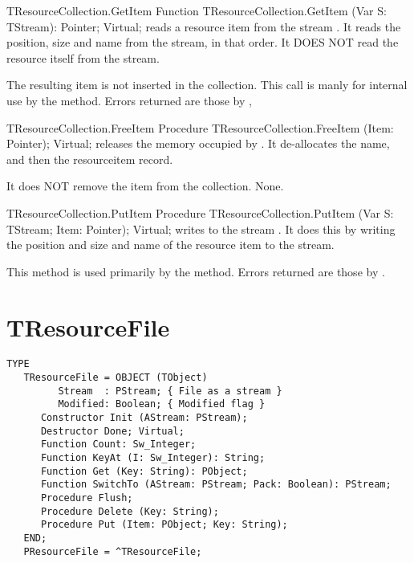 \begin{function}{TResourceCollection.GetItem}
\Declaration
Function TResourceCollection.GetItem (Var S: TStream): Pointer; Virtual;
\Description
{} reads a resource item from the stream . It reads the
position, size and name from the stream, in that order. It DOES NOT read the
resource itself from the stream.

The resulting item is not inserted in the collection. This call is manly for
internal use by the  method.
\Errors
Errors returned are those by 
\SeeAlso
{}, 
\end{function}

\begin{procedure}{TResourceCollection.FreeItem}
\Declaration
Procedure TResourceCollection.FreeItem (Item: Pointer); Virtual;
\Description
{} releases the memory occupied by . It de-allocates
the name, and then the resourceitem record.

It does NOT remove the item from the collection.
\Errors
None.
\SeeAlso
{}
\end{procedure}

\begin{procedure}{TResourceCollection.PutItem}
\Declaration
Procedure TResourceCollection.PutItem (Var S: TStream; Item: Pointer); Virtual;
\Description
{} writes  to the stream . It does this by
writing the position and size and name of the resource item to the stream.

This method is used primarily by the 
method.
\Errors
Errors returned are those by .
\SeeAlso
{}
\end{procedure}


\section{TResourceFile}
\label{se:TResourceFile}

\begin{verbatim}
TYPE
   TResourceFile = OBJECT (TObject)
         Stream  : PStream; { File as a stream }
         Modified: Boolean; { Modified flag }
      Constructor Init (AStream: PStream);
      Destructor Done; Virtual;
      Function Count: Sw_Integer;
      Function KeyAt (I: Sw_Integer): String;
      Function Get (Key: String): PObject;
      Function SwitchTo (AStream: PStream; Pack: Boolean): PStream;
      Procedure Flush;
      Procedure Delete (Key: String);
      Procedure Put (Item: PObject; Key: String);
   END;
   PResourceFile = ^TResourceFile;
\end{verbatim}

